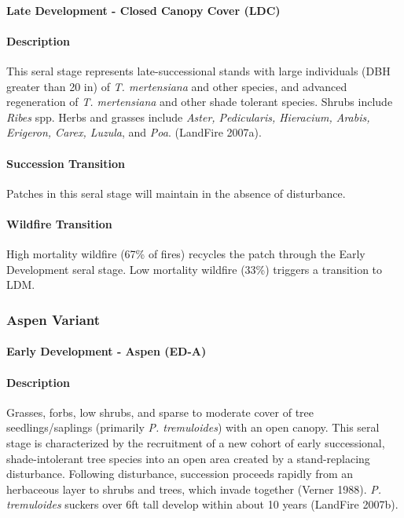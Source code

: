 \paragraph{Late Development - Closed Canopy Cover (LDC)}

\paragraph{Description} This seral stage represents late-successional stands with large individuals (DBH greater than 20 in) of \emph{T. mertensiana} and other species, and advanced regeneration of \emph{T. mertensiana} and other shade tolerant species. Shrubs include \emph{Ribes} spp. Herbs and grasses include \emph{Aster, Pedicularis, Hieracium, Arabis, Erigeron, Carex, Luzula}, and \emph{Poa}. (LandFire 2007a).

\paragraph{Succession Transition} Patches in this seral stage will maintain in the absence of disturbance.

\paragraph{Wildfire Transition} High mortality wildfire (67\% of fires) recycles the patch through the Early Development seral stage. Low mortality wildfire (33\%) triggers a transition to LDM. 

\noindent\hrulefill
\noindent\hrulefill

\subsubsection{Aspen Variant}

\paragraph{Early Development - Aspen (ED-A)}

\paragraph{Description} Grasses, forbs, low shrubs, and sparse to moderate cover of tree seedlings/saplings (primarily \emph{P. tremuloides}) with an open canopy. This seral stage is characterized by the recruitment of a new cohort of early successional, shade-intolerant tree species into an open area created by a stand-replacing disturbance. Following disturbance, succession proceeds rapidly from an herbaceous layer to shrubs and trees, which invade together (Verner 1988). \emph{P. tremuloides} suckers over 6ft tall develop within about 10 years (LandFire 2007b). 


